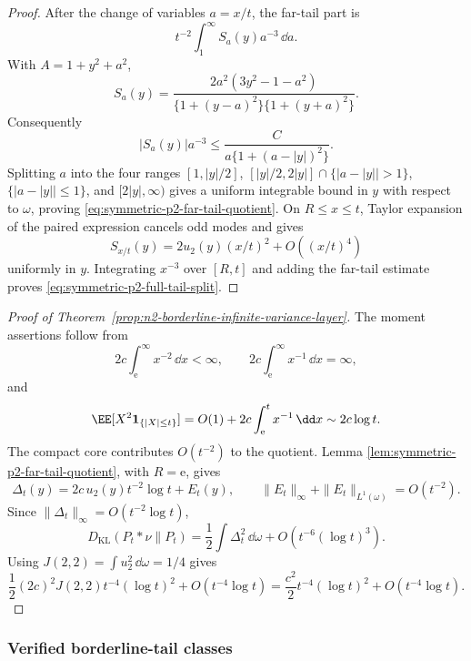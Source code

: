 \begin{proof}
After the change of variables \(a=x/t\), the far-tail part is
\[
  t^{-2}\int_1^\infty S_a(y)a^{-3}\,\dd a .
\]
With \(A=1+y^2+a^2\),
\[
S_a(y)
=\frac{2a^2(3y^2-1-a^2)}
       {\{1+(y-a)^2\}\{1+(y+a)^2\}} .
\]
Consequently
\[
 |S_a(y)|a^{-3}
 \le \frac{C}{a\{1+(a-|y|)^2\}}.
\]
Splitting \(a\) into the four ranges
\([1,|y|/2]\), \([|y|/2,2|y|]\cap\{|a-|y||>1\}\),
\(\{|a-|y||\le1\}\), and \([2|y|,\infty)\) gives a uniform integrable bound
in \(y\) with respect to \(\omega\), proving
\eqref{eq:symmetric-p2-far-tail-quotient}.  On \(R\le x\le t\), Taylor
expansion of the paired expression cancels odd modes and gives
\[
S_{x/t}(y)=2u_2(y)(x/t)^2+O((x/t)^4)
\]
uniformly in \(y\).  Integrating \(x^{-3}\) over \([R,t]\) and adding the
far-tail estimate proves \eqref{eq:symmetric-p2-full-tail-split}.
\end{proof}

\begin{proof}[Proof of Theorem~\ref{prop:n2-borderline-infinite-variance-layer}]
The moment assertions follow from
\[
  2c\int_{\mathrm e}^{\infty}x^{-2}\,\dd x<\infty,\qquad
  2c\int_{\mathrm e}^{\infty}x^{-1}\,\dd x=\infty,
\]
and
\[
  \EE[X^2\mathbf1_{\{|X|\le t\}}]
  =O(1)+2c\int_{\mathrm e}^{t}x^{-1}\,\dd x
  \sim2c\log t .
\]
The compact core contributes \(O(t^{-2})\) to the quotient.  Lemma
\ref{lem:symmetric-p2-far-tail-quotient}, with \(R=\mathrm e\), gives
\[
\Delta_t(y)=2c\,u_2(y)t^{-2}\log t+E_t(y),
\qquad
\|E_t\|_\infty+\|E_t\|_{L^1(\omega)}=O(t^{-2}).
\]
Since \(\|\Delta_t\|_\infty=O(t^{-2}\log t)\),
\[
D_{\mathrm{KL}}(P_t*\nu\|P_t)
=\frac12\int\Delta_t^2\,\dd\omega+O(t^{-6}(\log t)^3).
\]
Using \(J(2,2)=\int u_2^2\,\dd\omega=1/4\) gives
\[
\frac12(2c)^2J(2,2)t^{-4}(\log t)^2+O(t^{-4}\log t)
=\frac{c^2}{2}t^{-4}(\log t)^2+O(t^{-4}\log t).
\]
\end{proof}

\subsubsection*{Verified borderline-tail classes}\leavevmode\par\smallskip


